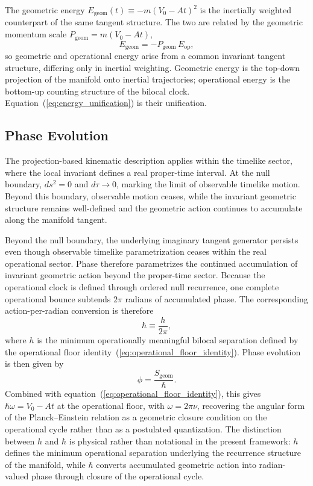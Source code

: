 \documentclass[fontsize=12pt, paper=a4]{scrartcl}
\begin{document}
The geometric energy $E_{\mathrm{geom}}(t) \equiv -m(V_0-At)^2$ is the inertially weighted counterpart of the same tangent structure. The two are related by the geometric momentum scale $P_{\mathrm{geom}} = m(V_0-At)$,
\begin{equation}
E_{\mathrm{geom}} = -P_{\mathrm{geom}}\,E_{\mathrm{op}},
\label{eq:energy_unification}
\end{equation}
so geometric and operational energy arise from a common invariant tangent structure, differing only in inertial weighting. Geometric energy is the top-down projection of the manifold onto inertial trajectories; operational energy is the bottom-up counting structure of the bilocal clock. Equation~(\ref{eq:energy_unification}) is their unification.

\subsection{Phase Evolution}
The projection-based kinematic description applies within the timelike sector, where the local invariant defines a real proper-time interval. At the null boundary, $ds^2=0$ and $d\tau \to 0$, marking the limit of observable timelike motion. Beyond this boundary, observable motion ceases, while the invariant geometric structure remains well-defined and the geometric action continues to accumulate along the manifold tangent.

Beyond the null boundary, the underlying imaginary tangent generator persists even though observable timelike parametrization ceases within the real operational sector. Phase therefore parametrizes the continued accumulation of invariant geometric action beyond the proper-time sector. Because the operational clock is defined through ordered null recurrence, one complete operational bounce subtends $2\pi$ radians of accumulated phase. The corresponding action-per-radian conversion is therefore
\begin{equation}
\hbar \equiv \frac{h}{2\pi},
\end{equation}
where $h$ is the minimum operationally meaningful bilocal separation defined by the operational floor identity~(\ref{eq:operational_floor_identity}). Phase evolution is then given by
\begin{equation}
\phi = \frac{S_{\mathrm{geom}}}{\hbar}.
\end{equation}
Combined with equation~(\ref{eq:operational_floor_identity}), this gives $\hbar\omega = V_0 - At$ at the operational floor, with $\omega = 2\pi\nu$, recovering the angular form of the Planck--Einstein relation as a geometric closure condition on the operational cycle rather than as a postulated quantization. The distinction between $h$ and $\hbar$ is physical rather than notational in the present framework: $h$ defines the minimum operational separation underlying the recurrence structure of the manifold, while $\hbar$ converts accumulated geometric action into radian-valued phase through closure of the operational cycle.
\end{document}
